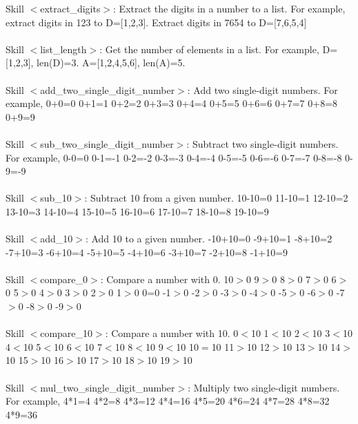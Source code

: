 \documentclass{article} %
\begin{document}
\begin{tcolorbox}[title = {Skills for GSM8K}, colback = Apricot!25!white, colframe = BrickRed!75!black,fontupper =\fontsize{9pt}{9pt}\selectfont] 
Skill $<$extract\_digits$>$: Extract the digits in a number to a list. For example, extract digits in 123 to D=[1,2,3]. Extract digits in 7654 to D=[7,6,5,4] \\ \\

Skill $<$list\_length$>$: Get the number of elements in a list. For example, D=[1,2,3], len(D)=3. A=[1,2,4,5,6], len(A)=5. \\ \\

Skill $<$add\_two\_single\_digit\_number$>$: Add two single-digit numbers. For example, 0+0=0 0+1=1 0+2=2 0+3=3 0+4=4 0+5=5 0+6=6 0+7=7 0+8=8 0+9=9 \\ \\


Skill $<$sub\_two\_single\_digit\_number$>$: Subtract two single-digit numbers.  For example, 0-0=0 0-1=-1 0-2=-2 0-3=-3 0-4=-4 0-5=-5 0-6=-6 0-7=-7 0-8=-8 0-9=-9 \\ \\

Skill $<$sub\_10$>$: Subtract 10 from a given number. 10-10=0 11-10=1 12-10=2 13-10=3 14-10=4 15-10=5 16-10=6 17-10=7 18-10=8 19-10=9 \\ \\

Skill $<$add\_10$>$: Add 10 to a given number. -10+10=0 -9+10=1 -8+10=2 -7+10=3 -6+10=4 -5+10=5 -4+10=6 -3+10=7 -2+10=8 -1+10=9\\ \\

Skill $<$compare\_0$>$: Compare a number with 0.  10$>$0 9$>$0 8$>$0 7$>$0 6$>$0 5$>$0 4$>$0 3$>$0 2$>$0 1$>$0 0=0 -1$>$0 -2$>$0 -3$>$0 -4$>$0 -5$>$0 -6$>$0 -7$>$0 -8$>$0 -9$>$0 \\ \\

Skill $<$compare\_10$>$: Compare a number with 10.  0$<$10 1$<$10 2$<$10 3$<$10 4$<$10 5$<$10 6$<$10 7$<$10 8$<$10 9$<$10 10$=$10 11$>$10 12$>$10 13$>$10 14$>$10 15$>$10 16$>$10 17$>$10 18$>$10 19$>$10  \\ \\

Skill $<$mul\_two\_single\_digit\_number$>$: Multiply two single-digit numbers.  For example, 4*1=4 4*2=8 4*3=12 4*4=16 4*5=20 4*6=24 4*7=28 4*8=32 4*9=36 \\ \\



\end{tcolorbox}
\end{document}
